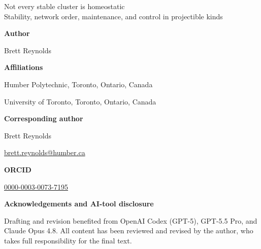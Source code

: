 \documentclass[12pt]{article}
\begin{document}
\begin{center}
{\Large Not every stable cluster is homeostatic}\\[0.5em]
{\large Stability, network order, maintenance, and control in projectible kinds}
\end{center}

\bigskip

\noindent\textbf{Author}

\noindent Brett Reynolds

\bigskip

\noindent\textbf{Affiliations}

\noindent Humber Polytechnic, Toronto, Ontario, Canada

\noindent University of Toronto, Toronto, Ontario, Canada

\bigskip

\noindent\textbf{Corresponding author}

\noindent Brett Reynolds

\noindent \href{mailto:brett.reynolds@humber.ca}{brett.reynolds@humber.ca}

\bigskip

\noindent\textbf{ORCID}

\noindent \href{https://orcid.org/0000-0003-0073-7195}{0000-0003-0073-7195}

\bigskip

\noindent\textbf{Acknowledgements and AI-tool disclosure}

\noindent Drafting and revision benefited from OpenAI Codex (GPT-5), GPT-5.5 Pro,
and Claude Opus 4.8. All content has been reviewed and revised by the author, who
takes full responsibility for the final text.
\end{document}
